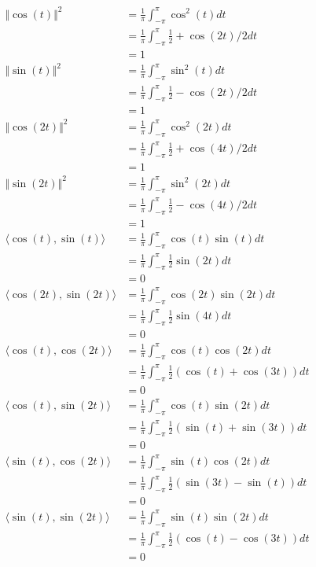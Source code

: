 \documentclass{article}
\newcommand{\inprod}[1]{\langle #1 \rangle}
\begin{document}
	\begin{align*}
	\Vert \cos(t) \Vert^2 &= \frac{1}{\pi} \int_{-\pi}^{\pi} \cos^2(t) dt \\
	&= \frac{1}{\pi} \int_{-\pi}^{\pi} \frac{1}{2} + \cos(2t)/2 dt \\
	&= 1 \\
	\Vert \sin(t) \Vert^2 &= \frac{1}{\pi} \int_{-\pi}^{\pi} \sin^2(t) dt \\
	&= \frac{1}{\pi} \int_{-\pi}^{\pi} \frac{1}{2} - \cos(2t)/2 dt \\
	&= 1 \\
	\Vert \cos(2t) \Vert^2 &= \frac{1}{\pi} \int_{-\pi}^{\pi} \cos^2(2t)dt \\
	&= \frac{1}{\pi} \int_{-\pi}^{\pi} \frac{1}{2} + \cos(4t)/2 dt \\
	&= 1 \\
	\Vert \sin(2t) \Vert^2 &= \frac{1}{\pi} \int_{-\pi}^{\pi} \sin^2(2t)dt\\
	&= \frac{1}{\pi} \int_{-\pi}^{\pi} \frac{1}{2} - \cos(4t)/2 dt \\
	&= 1 \\
	\inprod{\cos(t), \sin(t)} &= \frac{1}{\pi} \int_{-\pi}^{\pi} \cos(t)\sin(t) dt \\
	&= \frac{1}{\pi} \int_{-\pi}^{\pi} \frac{1}{2} \sin(2t) dt \\
	&= 0 \\
	\inprod{\cos(2t), \sin(2t)} &= \frac{1}{\pi} \int_{-\pi}^{\pi} \cos(2t)\sin(2t)dt \\
	&= \frac{1}{\pi} \int_{-\pi}^{\pi} \frac{1}{2} \sin(4t) dt \\
	&= 0 \\
	\inprod{\cos(t), \cos(2t)} &= \frac{1}{\pi} \int_{-\pi}^{\pi} \cos(t) \cos(2t) dt \\
	&= \frac{1}{\pi} \int_{-\pi}^{\pi}\frac{1}{2} (\cos(t) + \cos(3t)) dt \\
	&= 0 \\
	\inprod{\cos(t), \sin(2t)} &= \frac{1}{\pi} \int_{-\pi}^{\pi} \cos(t) \sin(2t) dt \\
	&= \frac{1}{\pi} \int_{-\pi}^{\pi} \frac{1}{2} (\sin(t) + \sin(3t)) dt \\
	&= 0 \\
	\inprod{\sin(t), \cos(2t)} &= \frac{1}{\pi} \int_{-\pi}^{\pi} \sin(t) \cos(2t) dt \\
	&= \frac{1}{\pi} \int_{-\pi}^{\pi} \frac{1}{2} (\sin(3t) - \sin(t)) dt \\
	&= 0 \\
	\inprod{\sin(t), \sin(2t)} &= \frac{1}{\pi} \int_{-\pi}^{\pi} \sin(t) \sin(2t) dt \\
	&= \frac{1}{\pi} \int_{-\pi}^{\pi} \frac{1}{2} (\cos(t) - \cos(3t)) dt \\
	&= 0
	\end{align*}
	
\end{document}
